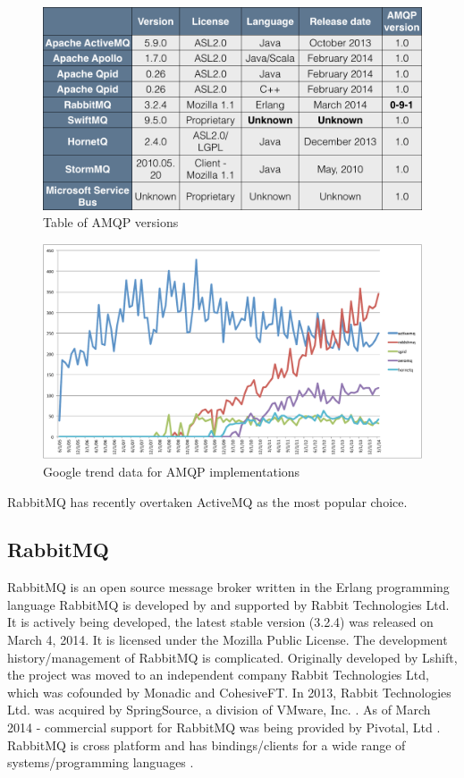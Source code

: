 \documentclass{thesis}
\begin{document}
\begin{figure}[h]
\centering
\label{amqp_broker_table}
\includegraphics[scale=.40]{table_of_amqp_message_brokers}  
\caption{Table of AMQP versions }
\end{figure}

\begin{figure}[h]
\centering
\includegraphics[scale=.5]{broker_popularity}  
\caption{Google trend data for AMQP implementations}
\end{figure}

RabbitMQ has recently overtaken ActiveMQ as the most popular choice.


\subsection{RabbitMQ}
RabbitMQ is an open source message broker written in the Erlang programming language \cite{RABBITMQ} RabbitMQ is developed by and supported by Rabbit Technologies Ltd.  It is actively being developed, the latest stable version (3.2.4) was released on March 4, 2014.  It is licensed under the Mozilla Public License.  The development history/management of RabbitMQ is complicated.  Originally developed by Lshift, the project was moved to an independent company Rabbit Technologies Ltd, which was cofounded by Monadic and CohesiveFT.  In 2013, Rabbit Technologies Ltd. was acquired by SpringSource, a division of VMware, Inc. \cite{LSHIFT}.  As of March 2014 - commercial support for RabbitMQ was being provided by Pivotal, Ltd \cite{PIVOTAL}.  RabbitMQ is cross platform and has bindings/clients for a wide range of systems/programming languages \cite{RABBITMQ_CLIENTS}.  
\end{document}
